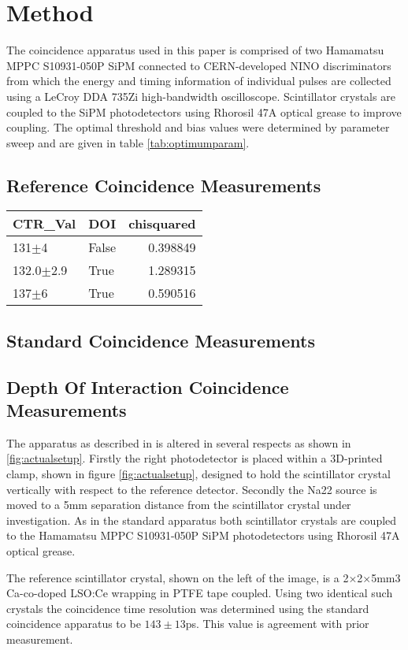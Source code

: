 \section{Method}
The coincidence apparatus used in this paper is comprised of two Hamamatsu MPPC S10931-050P SiPM connected to CERN-developed NINO discriminators from which the energy and timing information of individual pulses are collected using a LeCroy DDA 735Zi high-bandwidth oscilloscope. Scintillator crystals are coupled to the SiPM photodetectors using Rhorosil 47A optical grease to improve coupling. The optimal threshold and bias values were determined by parameter sweep and are given in table \ref{tab:optimumparam}.

\subsection{Reference Coincidence Measurements}

\begin{tabular}{llr}
\hline
       CTR\_Val &    DOI &  chisquared \\
\hline
     131$\pm$4 &  False &    0.398849 \\
 132.0$\pm$2.9 &   True &    1.289315 \\
     137$\pm$6 &   True &    0.590516 \\
\hline
\end{tabular}

\subsection{Standard Coincidence Measurements}

\subsection{Depth Of Interaction Coincidence Measurements}
The apparatus as described in \cite{arron_Meyer_Pauwels_Lecoq_2012} is altered in several respects as shown in \ref{fig:actualsetup}. Firstly the right photodetector is placed within a 3D-printed clamp, shown in figure \ref{fig:actualsetup}, designed to hold the scintillator crystal vertically with respect to the reference detector. Secondly the Na22 source is moved to a 5mm separation distance from the scintillator crystal under investigation. As in the standard apparatus both scintillator crystals are coupled to the Hamamatsu MPPC S10931-050P SiPM photodetectors using Rhorosil 47A optical grease. 

The reference scintillator crystal, shown on the left of the image, is a 2×2×5mm3 Ca-co-doped LSO:Ce wrapping in PTFE tape coupled. Using two identical such crystals the coincidence time resolution was determined using the standard coincidence apparatus to be $143\pm13$ps. This value is agreement with prior measurement\cite{arron_Meyer_Pauwels_Lecoq_2012}.